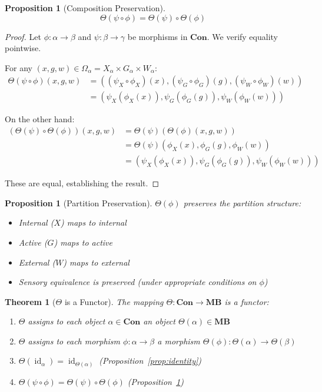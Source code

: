 \documentclass[11pt,a4paper]{article}
\theoremstyle{definition}
\theoremstyle{plain}
\newtheorem{theorem}[definition]{Theorem}
\newtheorem{proposition}[definition]{Proposition}
\theoremstyle{remark}
\newcommand{\Con}{\mathbf{Con}}
\newcommand{\MB}{\mathbf{MB}}
\DeclareMathOperator{\id}{id}
\begin{document}
\begin{proposition}[Composition Preservation]\label{prop:composition}
\[
\Theta(\psi \circ \phi) = \Theta(\psi) \circ \Theta(\phi)
\]
\end{proposition}

\begin{proof}
Let $\phi: \alpha \to \beta$ and $\psi: \beta \to \gamma$ be morphisms in $\Con$. We verify equality pointwise.

For any $(x, g, w) \in \Omega_\alpha = X_\alpha \times G_\alpha \times W_\alpha$:
\begin{align*}
\Theta(\psi \circ \phi)(x, g, w) &= ((\psi_X \circ \phi_X)(x), (\psi_G \circ \phi_G)(g), (\psi_W \circ \phi_W)(w)) \\
&= (\psi_X(\phi_X(x)), \psi_G(\phi_G(g)), \psi_W(\phi_W(w)))
\end{align*}

On the other hand:
\begin{align*}
(\Theta(\psi) \circ \Theta(\phi))(x, g, w) &= \Theta(\psi)(\Theta(\phi)(x, g, w)) \\
&= \Theta(\psi)(\phi_X(x), \phi_G(g), \phi_W(w)) \\
&= (\psi_X(\phi_X(x)), \psi_G(\phi_G(g)), \psi_W(\phi_W(w)))
\end{align*}

These are equal, establishing the result.
\end{proof}

\begin{proposition}[Partition Preservation]
$\Theta(\phi)$ preserves the partition structure:
\begin{itemize}
    \item Internal ($X$) maps to internal
    \item Active ($G$) maps to active
    \item External ($W$) maps to external
    \item Sensory equivalence is preserved (under appropriate conditions on $\phi$)
\end{itemize}
\end{proposition}

\begin{theorem}[$\Theta$ is a Functor]\label{thm:theta-functor}
The mapping $\Theta: \Con \to \MB$ is a functor:
\begin{enumerate}[label=(\roman*)]
    \item $\Theta$ assigns to each object $\alpha \in \Con$ an object $\Theta(\alpha) \in \MB$
    \item $\Theta$ assigns to each morphism $\phi: \alpha \to \beta$ a morphism $\Theta(\phi): \Theta(\alpha) \to \Theta(\beta)$
    \item $\Theta(\id_\alpha) = \id_{\Theta(\alpha)}$ (Proposition~\ref{prop:identity})
    \item $\Theta(\psi \circ \phi) = \Theta(\psi) \circ \Theta(\phi)$ (Proposition~\ref{prop:composition})
\end{enumerate}
\end{theorem}
\end{document}
